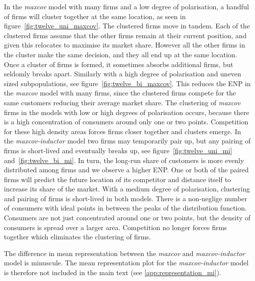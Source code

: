 \documentclass[preprint, 12pt]{elsarticle}
\begin{document}
In the \emph{maxcov} model with many firms and a low degree of polarisation, a handful of firms will cluster together at the same location, as seen in figure~\ref{fig:twelve_uni_maxcov}. The clustered firms move in tandem. Each of the clustered firms assume that the other firms remain at their current position, and given this relocates to maximise its market share. However all the other firms in the cluster make the same decision, and they all end up at the same location. Once a cluster of firms is formed, it sometimes absorbs additional firms, but seldomly breaks apart. Similarly with a high degree of polarisation and uneven sized subpopulations, see figure~\ref{fig:twelve_bi_maxcov}. This reduces the ENP in the \emph{maxcov} model with many firms, since the clustered firms compete for the same customers reducing their average market share. The clustering of \emph{maxcov} firms in the models with low or high degrees of polarisation occurs, because there is a high concentration of consumers around only one or two points. Competition for these high density areas forces firms closer together and clusters emerge. In the \emph{maxcov-inductor} model two firms may temporarily pair up, but any pairing of firms is short-lived and eventually breaks up, see figure~\ref{fig:twelve_uni_mi} and~\ref{fig:twelve_bi_mi}. In turn, the long-run share of customers is more evenly distributed among firms and we observe a higher ENP. One or both of the paired firms will predict the future location of its competitor and distance itself to increase its share of the market. With a medium degree of polarisation, clustering and pairing of firms is short-lived in both models. There is a non-neglige number of consumers with ideal points in between the peaks of the distribution function. Consumers are not just concentrated around one or two points, but the density of consumers is spread over a larger area. Competition no longer forces firms together which eliminates the clustering of firms.

The difference in mean representation between the \emph{maxcov} and \emph{maxcov-inductor} model is minuscule. The mean representation plot for the \emph{maxcov-inductor} model is therefore not included in the main text (see \ref{app:representation_mi}).
\end{document}
